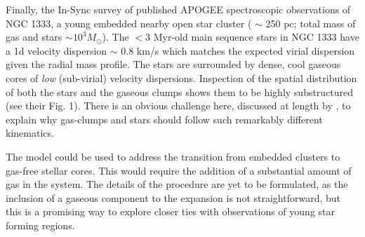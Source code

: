 Finally, the In-Sync survey of \cite{Foster2015} published APOGEE spectroscopic observations of NGC 1333, a young embedded nearby open star cluster ( $\sim$ 250 pc; total mass of gas and stars $\sim10^3 M_\odot$). The $< 3 $ Myr-old main sequence stars in NGC 1333 have a 1d velocity dispersion $\sim$ 0.8 km/s which matches the expected virial dispersion given the radial mass profile. The stars are surrounded by dense, cool gaseous cores of {\it low} (sub-virial) velocity dispersions. Inspection of the spatial distribution of both the stars and the gaseous clumps shows them to be highly substructured (see their Fig. 1). There is an obvious challenge here, discussed at length by \citeauthor{Foster2015}, to explain why gas-clumps and stars should follow such remarkably different kinematics.

The \HubLem model could be used to address the transition from embedded clusters to gas-free stellar cores. This would require the addition of  a substantial amount of gas in the system. The details of the procedure are yet to be formulated, as the inclusion of a gaseous component to the expansion is not straightforward, but this is a promising way to explore closer ties with observations of young star forming regions.
